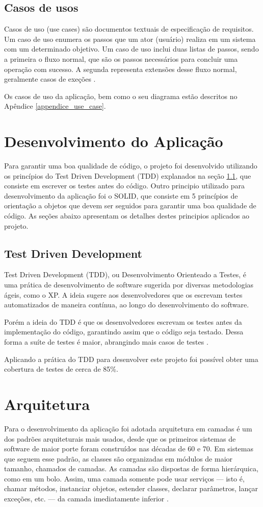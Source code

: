\documentclass[12pt]{article}
\begin{document}
\subsection{Casos de usos}
Casos de uso (use cases) são documentos textuais de especificação de requisitos. Um caso de uso enumera os passos que um ator (usuário) realiza em um sistema com um determinado objetivo. Um caso de uso inclui duas listas de passos, sendo a primeira o fluxo normal, que são os passos necessários para concluir uma operação com sucesso. A segunda representa extensões desse fluxo normal, geralmente casos de exeções \cite[Capítulo 3.1]{engsoftware}.

Os casos de uso da aplicação, bem como o seu diagrama estão descritos no Apêndice \ref{appendice_use_case}.

\section{Desenvolvimento do Aplicação}
Para garantir uma boa qualidade de código, o projeto foi desenvolvido utilizando os princípios do Test Driven Development (TDD) explanados na seção \ref{TDD}, que consiste em escrever os testes antes do código. Outro principio utilizado para desenvolvimento da aplicação foi o SOLID, que consiste em 5 princípios de orientação a objetos que devem ser seguidos para garantir uma boa qualidade de código. As seções abaixo apresentam os detalhes destes principios aplicados ao projeto.

\subsection{Test Driven Development}
\label{TDD}
Test Driven Development (TDD), ou Desenvolvimento Orienteado a Testes, é uma prática de desenvolvimento de software sugerida por diversas metodologias ágeis, como o XP. A ideia sugere  aos desenvolvedores que os escrevam testes automatizados de maneira contínua, ao longo do desenvolvimento do software.

Porém a ideia do TDD é que os desenvolvedores escrevam os testes antes da implementação do código, garantindo assim que o código seja testado. Dessa forma a suíte de testes é maior, abrangindo mais casos de testes \cite[Capítulo 8.1]{engsoftware}.

Aplicando a prática do TDD para desenvolver este projeto foi possível obter uma cobertura de testes de cerca de 85\%.

\section{Arquitetura}
Para o desenvolvimento da aplicação foi adotada arquitetura em camadas é um dos padrões arquiteturais mais usados, desde que os primeiros sistemas de software de maior porte foram construídos nas décadas de 60 e 70. Em sistemas que seguem esse padrão, as classes são organizadas em módulos de maior tamanho, chamados de camadas. As camadas são dispostas de forma hierárquica, como em um bolo. Assim, uma camada somente pode usar serviços — isto é, chamar métodos, instanciar objetos, estender classes, declarar parâmetros, lançar exceções, etc. — da camada imediatamente inferior \cite[Capítulo 7.2]{engsoftware}. 
\end{document}
